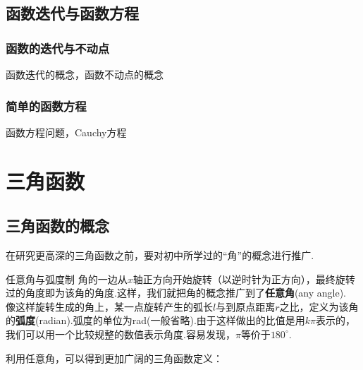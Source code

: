 \documentclass[lang=cn, zihao=5]{elegantbook}
\begin{document}
\section{函数迭代与函数方程}

\subsection{函数的迭代与不动点}

函数迭代的概念，函数不动点的概念

\subsection{简单的函数方程}

函数方程问题，Cauchy方程

\chapter{三角函数}

\section{三角函数的概念}

在研究更高深的三角函数之前，要对初中所学过的“角”的概念进行推广.

\begin{definition}{任意角与弧度制} %
    角的一边从$x$轴正方向开始旋转（以逆时针为正方向），最终旋转过的角度即为该角的角度.这样，我们就把角的概念推广到了\textbf{任意角}(any angle).\\
    像这样旋转生成的角上，某一点旋转产生的弧长$l$与到原点距离$r$之比，定义为该角的\textbf{弧度}(radian).弧度的单位为rad(一般省略).由于这样做出的比值是用$k \pi$表示的，我们可以用一个比较规整的数值表示角度.容易发现，$\pi$等价于$180^{\circ}$.
\end{definition}

利用任意角，可以得到更加广阔的三角函数定义：
\end{document}
